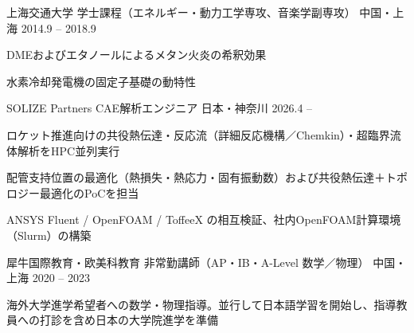 \documentclass[10pt,a4paper]{article}
\begin{document}
\eduentry
  {上海交通大学}
  {学士課程（エネルギー・動力工学専攻、音楽学副専攻）}
  {中国・上海}
  {2014.9 -- 2018.9}
  {\item DMEおよびエタノールによるメタン火炎の希釈効果
   \item 水素冷却発電機の固定子基礎の動特性}



\eduentry
  {SOLIZE Partners}
  {CAE解析エンジニア}
  {日本・神奈川}
  {2026.4 --}
  {\item ロケット推進向けの共役熱伝達・反応流（詳細反応機構／Chemkin）・超臨界流体解析をHPC並列実行
   \item 配管支持位置の最適化（熱損失・熱応力・固有振動数）および共役熱伝達＋トポロジー最適化のPoCを担当
   \item ANSYS Fluent / OpenFOAM / ToffeeX の相互検証、社内OpenFOAM計算環境（Slurm）の構築}

\eduentry
  {犀牛国際教育・欧美科教育}
  {非常勤講師（AP・IB・A-Level 数学／物理）}
  {中国・上海}
  {2020 -- 2023}
  {\item 海外大学進学希望者への数学・物理指導。並行して日本語学習を開始し、指導教員への打診を含め日本の大学院進学を準備}
\end{document}

